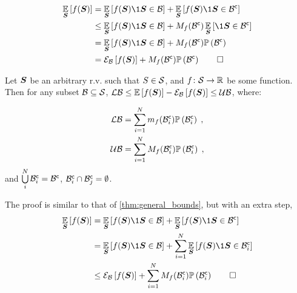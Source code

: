 \begin{proofE}
	\begin{align*}
		\expectation{f(\RV)}{\RV} & = \expectation{f(\RV)\1{\RV\in \subSpace}}{\RV}+ \expectation{f(\RV)\1{\RV\in \stcomp{\subSpace}}}{\RV}
		\\
		& \leq \expectation{f(\RV)\1{\RV\in \subSpace}}{\RV} +M_f(\stcomp{\subSpace})\expectation{\1{\RV\in \stcomp{\subSpace}}}{\RV}
		\\
		& =\expectation{f(\RV)\1{\RV\in \subSpace}}{\RV} +M_f(\stcomp{\subSpace})\measure{\stcomp{\subSpace}}
		\\
		& =\partialexpectation{f(\RV)}{\subSpace} +M_f(\stcomp{\subSpace})\measure{\stcomp{\subSpace}}\qed
	\end{align*}
\end{proofE}

\begin{theoremE}
	\label{thm:general_bounds_multi}
	Let $\boldsymbol S$ be an arbitrary r.v. such that $S\in\mathcal S$, and  $f\colon\mathcal S\to\mathbb{R}$ be some function. Then for any subset $\mathcal B\subseteq\mathcal S$, $\operatorname*{\mathcal{LB}}\leq\operatorname*{\mathbb{E}}\limits_{}\left[{f(\boldsymbol S)}\right]-\mathcal{E}_{\mathcal B}\left[{f(\boldsymbol S)}\right]\leq\operatorname*{\mathcal{UB}}$, where:
	\begin{subequations}
		\begin{align}
			\operatorname*{\mathcal{LB}} & = \sum_{i=1}^Nm_f({\mathcal B}^{\mathsf{c}}_{i})\mathbb{P}\left({{\mathcal B}^{\mathsf{c}}_{i}}\right)\;,
			\\
			\operatorname*{\mathcal{UB}} & = \sum_{i=1}^NM_f({\mathcal B}^{\mathsf{c}}_{i})\mathbb{P}\left({{\mathcal B}^{\mathsf{c}}_{i}}\right)\;,
		\end{align}
	\end{subequations}
	and $\bigcup\limits_i^N{\mathcal B}^{\mathsf{c}}_{i}={\mathcal B}^{\mathsf{c}}$, ${\mathcal B}^{\mathsf{c}}_{i}\cap{\ensuremath{\mathcal B}}^{\mathsf{c}}_j=\emptyset$.
\end{theoremE}
\begin{proofE}
	The proof is similar to that of \cref{thm:general_bounds}, but with an extra step,
	\begin{align*}
		\expectation{f(\RV)}{\RV} & = \expectation{f(\RV)\1{\RV\in \subSpace}}{\RV}+ \expectation{f(\RV)\1{\RV\in \stcomp{\subSpace}}}{\RV}
		\\&=\expectation{f(\RV)\1{\RV\in \subSpace}}{\RV}+\sum_{i=1}^N\expectation{f(\RV)\1{\RV\in \stcompI{\subSpace}{i}}}{\RV}\\
		&\leq\partialexpectation{f(\RV)}{\subSpace} +\sum_{i=1}^NM_f(\stcompI{\subSpace}{i})\measure{\stcompI{\subSpace}{i}}\qed
	\end{align*}
\end{proofE}

